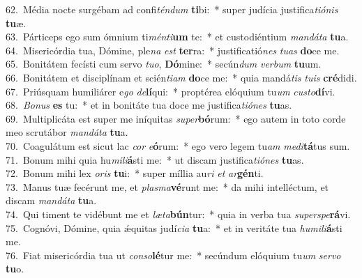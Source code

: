 {62.~}Média nocte surgébam ad confi\textit{tén}\textit{dum} \textbf{ti}bi:~* super judícia justifica\textit{ti}\textit{ó}\textit{nis} \textbf{tu}æ.\\
{63.~}Párticeps ego sum ómnium ti\textit{mén}\textit{ti}\textbf{um} te:~* et custodiéntium \textit{man}\textit{dá}\textit{ta} \textbf{tu}a.\\
{64.~}Misericórdia tua, Dómine, ple\textit{na} \textit{est} \textbf{ter}ra:~* justificatió\textit{nes} \textit{tu}\textit{as} \textbf{do}ce me.\\
{65.~}Bonitátem fecísti cum servo \textit{tu}\textit{o}, \textbf{Dó}mine:~* secún\textit{dum} \textit{ver}\textit{bum} \textbf{tu}um.\\
{66.~}Bonitátem et disciplínam et scién\textit{ti}\textit{am} \textbf{do}ce me:~* quia mandá\textit{tis} \textit{tu}\textit{is} \textbf{cré}didi.\\
{67.~}Priúsquam humiliárer e\textit{go} \textit{de}\textbf{lí}qui:~* proptérea elóquium tu\textit{um} \textit{cu}\textit{sto}\textbf{dí}vi.\\
{68.~}\textit{Bo}\textit{nus} \textbf{es} tu:~* et in bonitáte tua doce me justifica\textit{ti}\textit{ó}\textit{nes} \textbf{tu}as.\\
{69.~}Multiplicáta est super me iníquitas \textit{su}\textit{per}\textbf{bó}rum:~* ego autem in toto corde meo scrutábor \textit{man}\textit{dá}\textit{ta} \textbf{tu}a.\\
{70.~}Coagulátum est sicut lac \textit{cor} \textit{e}\textbf{ó}rum:~* ego vero legem tu\textit{am} \textit{me}\textit{di}\textbf{tá}tus sum.\\
{71.~}Bonum mihi quia hu\textit{mi}\textit{li}\textbf{á}sti me:~* ut discam justifica\textit{ti}\textit{ó}\textit{nes} \textbf{tu}as.\\
{72.~}Bonum mihi lex \textit{o}\textit{ris} \textbf{tu}i:~* super míllia au\textit{ri} \textit{et} \textit{ar}\textbf{gén}ti.\\
{73.~}Manus tuæ fecérunt me, et \textit{plas}\textit{ma}\textbf{vé}runt me:~* da mihi intelléctum, et discam \textit{man}\textit{dá}\textit{ta} \textbf{tu}a.\\
{74.~}Qui timent te vidébunt me et \textit{læ}\textit{ta}\textbf{bún}tur:~* quia in verba tua \textit{su}\textit{per}\textit{spe}\textbf{rá}vi.\\
{75.~}Cognóvi, Dómine, quia ǽquitas judí\textit{ci}\textit{a} \textbf{tu}a:~* et in veritáte tua \textit{hu}\textit{mi}\textit{li}\textbf{á}sti me.\\
{76.~}Fiat misericórdia tua ut \textit{con}\textit{so}\textbf{lé}tur me:~* secúndum elóquium tu\textit{um} \textit{ser}\textit{vo} \textbf{tu}o.\\
